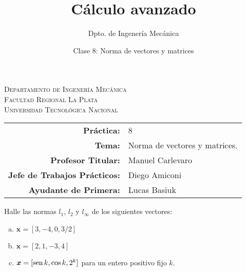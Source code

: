 \documentclass[11pt]{article}
\title{Cálculo avanzado}
\author{Dpto. de Ingenería Mecánica}
\date{Clase 8: Norma de vectores y matrices}
\begin{document}

\begin{center}
\end{center} 

\begin{center}
\vspace{\baselineskip}
\Large{\textsc{Departamento de Ingenería Mecánica}} \\
\textsc{Facultad Regional La Plata} \\
\textsc{Universidad Tecnológica Nacional}
\end{center}


\begin{center}
\begin{tabular}{r l}
    \textbf{Práctica:} & 8 \\
 \textbf{Tema:} & Norma de vectores y matrices. \\
 \textbf{Profesor Titular:} & Manuel Carlevaro \\
 \textbf{Jefe de Trabajos Prácticos:} & Diego Amiconi \\
 \textbf{Ayudante de Primera:} & Lucas Basiuk 
\end{tabular}\end{center}

\vspace{1em}

\begin{question} %
    Halle las normas $l_1$, $l_2$ y $l_{\infty}$ de los siguientes vectores:
    \begin{enumerate}[a)]
    \item $\bm{x} = [3, -4, 0, 3/2]$
    \item $\bm{x} = [2, 1, -3, 4]$
    \item $\bm{x} = [\operatorname{sen} k, \cos k, 2^k]$ para un entero positivo fijo $k$.
    \end{enumerate}
\end{question}
\end{document}

